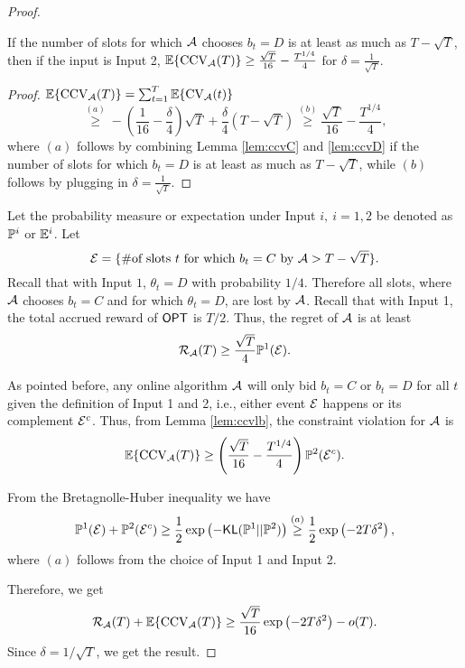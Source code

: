 \begin{proof}
\begin{lemma}\label{lem:ccvlb}
If the number of slots for which $\mathcal{A}$ chooses $b_t=D$ is at least as much as $T-\sqrt{T}$, then if the input is Input 2, 
${\mathbb{E}}\{\text{CCV}_{\mathcal{A}}(T)\} \ge \frac{\sqrt{T}}{16} - \frac{T^{1/4}}{4}$ for $\delta=\frac{1}{\sqrt{T}}$.

\end{lemma}
\begin{proof}  ${\mathbb{E}}\{\text{CCV}_{\mathcal{A}}(T)\} = \sum_{t=1}^{T} {\mathbb{E}}\{\text{CV}_{\mathcal{A}}(t)\}$
$$\stackrel{(a)}\ge -\left(\frac{1}{16}-\frac{\delta}{4}\right)\sqrt{T} + \frac{\delta}{4} (T-\sqrt{T}) \stackrel{(b)} \ge  \frac{\sqrt{T}}{16} - \frac{T^{1/4}}{4},$$
where $(a)$ follows by combining Lemma \ref{lem:ccvC} and \ref{lem:ccvD} if the number of slots for which $b_t=D$ is at least as much as $T-\sqrt{T}$, while $(b)$ follows by plugging in $\delta=\frac{1}{\sqrt{T}}$.
\end{proof}

Let the probability measure or expectation under Input $i, \ i=1,2$ be denoted as ${\mathbb{P}}^i$ or ${\mathbb{E}}^i$.
Let 
$$\mathcal{E} = \{\# \text{of slots $t$ for which} \ b_t=C \ \text{by} \ \mathcal{A} > T-\sqrt{T}\}.$$
Recall that with Input $1$, $\theta_t=D$ with probability $1/4$. Therefore all slots, where $\mathcal{A}$ chooses $b_t=C$ and for which $\theta_t=D$, are lost by $\mathcal{A}$. Recall that with Input 1, the total accrued reward of $\mathsf{OPT}$ is $T/2$. 
Thus, the regret of $\mathcal{A}$ is at least 
$$\mathcal{R}_{\mathcal{A}}(T) \ge \frac{\sqrt{T}}{4} {\mathbb{P}}^1(\mathcal{E}).$$

As pointed before, any online algorithm $\mathcal{A}$ will only bid $b_t = C$ or 
$b_t=D$ for all $t$ given the definition of Input 1 and 2, i.e., either event $\mathcal{E}$ happens or its complement $\mathcal{E}^c$. 
Thus, from Lemma \ref{lem:ccvlb}, the constraint violation for $\mathcal{A}$ is 
$${\mathbb{E}}\{\text{CCV}_{\mathcal{A}}(T)\} \ge \left(\frac{\sqrt{T}}{16} - \frac{T^{1/4}}{4}\right){\mathbb{P}}^2(\mathcal{E}^c).$$

From the Bretagnolle-Huber inequality \cite{lattimore2020bandit}
 we have 
$${\mathbb{P}}^1(\mathcal{E}) + {\mathbb{P}}^2(\mathcal{E}^c) \ge \frac{1}{2} \exp\left(-\textsf{KL}({\mathbb{P}}^1|| {\mathbb{P}}^2)\right) \stackrel{(a)}\ge \frac{1}{2} \exp\left(- 2T \delta^2\right),$$
where $(a)$ follows from the choice of Input 1 and Input 2.

Therefore, we get 
$$\mathcal{R}_{\mathcal{A}}(T) + {\mathbb{E}}\{\text{CCV}_{\mathcal{A}}(T)\} \ge \frac{\sqrt{T}}{16} \exp\left(- 2T \delta^2\right) - o(T).$$
Since $\delta=1/\sqrt{T}$, we get the result.
\end{proof}
